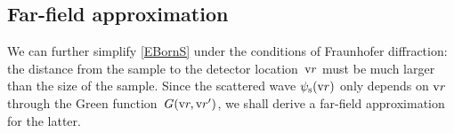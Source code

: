 %
%

\subsection{Far-field approximation}

%

We can further simplify \cref{EBornS}
under the conditions of Fraunhofer diffraction:
%
the distance from the sample to the detector location~$\text{v}{r}$
must be much larger than the size of the sample.
Since the scattered wave $\psi_\text{s}(\text{v}{r})$
only depends on $\text{v}{r}$ through the Green function~$G(\text{v}{r},\text{v}{r}')$,
we shall derive a far-field approximation for the latter.


